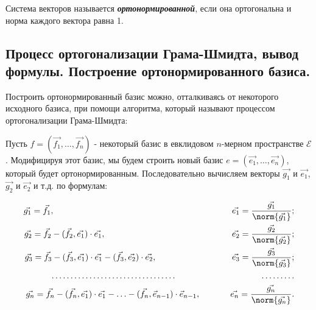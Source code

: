 \begin{definition}
    Система векторов называется \textit{\textbf{ортонормированной}}, если она ортогональна и норма каждого вектора равна 1.
\end{definition}


\newpage


\subsection{
    Процесс ортогонализации Грама-Шмидта, вывод формулы. Построение ортонормированного базиса.
}

Построить ортонормированный базис можно, отталкиваясь от некоторого исходного базиса, при помощи алгоритма, который называют процессом ортогонализации Грама-Шмидта:

\bigbreak

Пусть $f = (\vec{f_1}, \ldots, \vec{f_n})$ - некоторый базис в евклидовом $n$-мерном пространстве $\mathcal{E}$. Модифицируя этот базис, мы будем строить новый базис $e = (\vec{e_1}, \ldots, \vec{e_n})$, который будет ортонормированным. Последовательно вычисляем векторы $\vec{g_1}$ и $\vec{e_1}$, $\vec{g_2}$ и $\vec{e_2}$ и т.д. по формулам:

\begin{align*}
    \vec{g_1} = \vec{f_1}, \quad \quad \quad \quad \quad \quad \quad \quad \quad \quad \quad \quad \quad \quad \quad
    \quad \quad \quad \quad \quad \thinspace \thinspace \thinspace \thinspace \thinspace \vec{e_1} = \frac{\vec{g_1}}{\norm{\vec{g_1}}};\\
    \vec{g_2} = \vec{f_2} - (\vec{f_2}, \vec{e_1}) \cdot \vec{e_1}, \quad \quad \quad \quad \quad \quad \quad \quad \quad \quad
    \quad \quad \quad \quad \thinspace \thinspace \thinspace \thinspace \thinspace \vec{e_2} = \frac{\vec{g_2}}{\norm{\vec{g_2}}};\\
    \vec{g_3} = \vec{f_3} - (\vec{f_3}, \vec{e_1}) \cdot \vec{e_1} - (\vec{f_3}, \vec{e_2}) \cdot \vec{e_2}, \quad \quad \quad \quad \quad \quad \quad \quad \thinspace \thinspace \thinspace \thinspace \thinspace \vec{e_3} = \frac{\vec{g_3}}{\norm{\vec{g_3}}};\\
    \ldots \ldots \ldots \ldots \ldots \ldots \ldots
    \ldots \ldots \ldots \ldots
    \quad \quad \quad \quad \quad \quad
    \quad \quad \quad \quad
    \ldots \ldots \ldots \\
    \vec{g_n} = \vec{f_n} - (\vec{f_n}, \vec{e_1}) \cdot \vec{e_1} - \ldots - (\vec{f_n}, \vec{e}_{n - 1}) \cdot \vec{e}_{n - 1}, \quad \quad \quad \thinspace \thinspace \thinspace \vec{e_n} = \frac{\vec{g_n}}{\norm{\vec{g_n}}}.
\end{align*}

